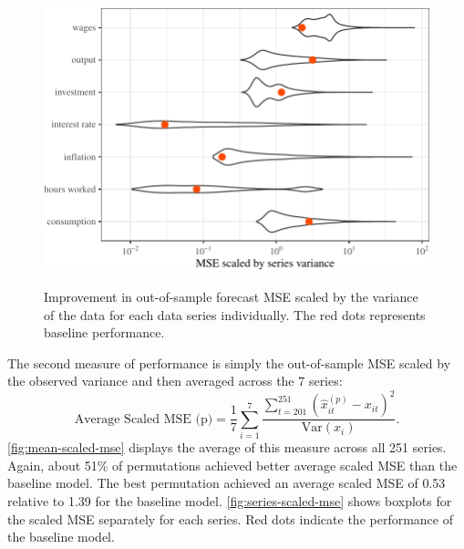 \documentclass[11pt]{article}
\renewcommand{\hat}{\widehat}
\begin{document}
\begin{figure}[t]
{\centering \includegraphics{gfx/series-scaled-mse-1} }

\caption{Improvement in out-of-sample forecast MSE scaled by the variance of the data for each data series individually. The red dots represents baseline performance.}\label{fig:series-scaled-mse}
\end{figure}

The second measure of performance is simply the out-of-sample MSE scaled
by the observed variance and then averaged across the 7 series:
\begin{equation}
  \mbox{Average Scaled MSE (p)} = \frac{1}{7} \sum_{i=1}^7
  \frac{\sum_{t=201}^{251} (\hat{x}_{it}^{(p)}-x_{it})^2}
    {\mbox{Var}(x_i)}.
\end{equation} \autoref{fig:mean-scaled-mse} displays the average of
this measure across all 251 series. Again, about 51\% of permutations
achieved better average scaled MSE than the baseline model. The best
permutation achieved an average scaled MSE of 0.53 relative to 1.39 for
the baseline model. \autoref{fig:series-scaled-mse} shows boxplots for
the scaled MSE separately for each series. Red dots indicate the
performance of the baseline model.
\end{document}
